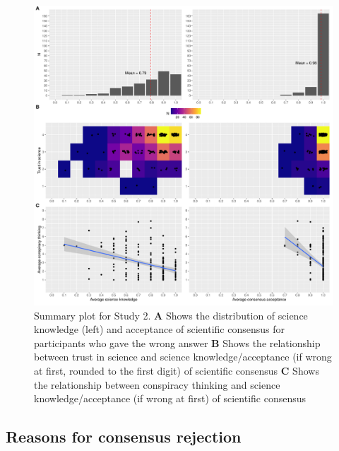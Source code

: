 \documentclass[
  doc,floatsintext]{apa6}
\begin{document}
\begin{figure}
\centering
\includegraphics{output/figures/exp2-plot-overview.pdf}
\caption{\label{fig:exp2-plot-overview}Summary plot for Study 2. \textbf{A} Shows the distribution of science knowledge (left) and acceptance of scientific consensus for participants who gave the wrong answer \textbf{B} Shows the relationship between trust in science and science knowledge/acceptance (if wrong at first, rounded to the first digit) of scientific consensus \textbf{C} Shows the relationship between conspiracy thinking and science knowledge/acceptance (if wrong at first) of scientific consensus}
\end{figure}

\subsection{Reasons for consensus rejection}\label{reasons-for-consensus-rejection}
\end{document}
